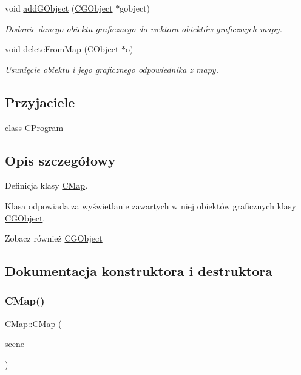 \begin{DoxyCompactItemize}
void \mbox{\hyperlink{class_c_map_adfb0980e5f2153cd6b287a010795c6b4}{add\+G\+Object}} (\mbox{\hyperlink{class_c_g_object}{C\+G\+Object}} $\ast$gobject)
\begin{DoxyCompactList}\small\item\em Dodanie danego obiektu graficznego do wektora obiektów graficznych mapy. \end{DoxyCompactList}\item 
void \mbox{\hyperlink{class_c_map_a55bccb7dd240a21de6e5d12df054d0cb}{delete\+From\+Map}} (\mbox{\hyperlink{class_c_object}{C\+Object}} $\ast$o)
\begin{DoxyCompactList}\small\item\em Usunięcie obiektu i jego graficznego odpowiednika z mapy. \end{DoxyCompactList}\end{DoxyCompactItemize}
\subsection*{Przyjaciele}
\begin{DoxyCompactItemize}
\item 
class \mbox{\hyperlink{class_c_map_a70c17e1cad4feb7c09e435afef6dd148}{C\+Program}}
\end{DoxyCompactItemize}


\subsection{Opis szczegółowy}
Definicja klasy \mbox{\hyperlink{class_c_map}{C\+Map}}. 

Klasa odpowiada za wyświetlanie zawartych w niej obiektów graficznych klasy \mbox{\hyperlink{class_c_g_object}{C\+G\+Object}}. \begin{DoxySeeAlso}{Zobacz również}
\mbox{\hyperlink{class_c_g_object}{C\+G\+Object}} 
\end{DoxySeeAlso}


\subsection{Dokumentacja konstruktora i destruktora}
\mbox{\label{class_c_map_a23632998cdecdd0b9c77c799e5d5d51b}} 
\subsubsection{\texorpdfstring{C\+Map()}{CMap()}}
{\footnotesize\ttfamily C\+Map\+::\+C\+Map (\begin{DoxyParamCaption}\item[{Q\+Graphics\+Scene $\ast$}]{scene }\end{DoxyParamCaption})}



